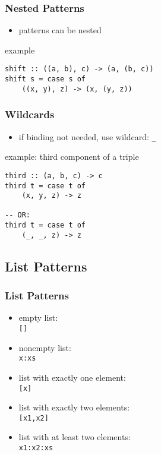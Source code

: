 \documentclass[dvipsnames]{beamer}
\theoremstyle{plain}
\begin{document}
\begin{frame}[fragile]
  \frametitle{Nested Patterns}

  \begin{itemize}
    \item patterns can be nested
  \end{itemize}

  \begin{exampleblock}{example}
    \begin{lstlisting}
shift :: ((a, b), c) -> (a, (b, c))
shift s = case s of
    ((x, y), z) -> (x, (y, z))
    \end{lstlisting}
  \end{exampleblock}
\end{frame}

\begin{frame}[fragile]
  \frametitle{Wildcards}

  \begin{itemize}
    \item if binding not needed, use wildcard: \lstinline|_|
  \end{itemize}

  \begin{exampleblock}{example: third component of a triple}
    \begin{lstlisting}
third :: (a, b, c) -> c
third t = case t of
    (x, y, z) -> z

-- OR:
third t = case t of
    (_, _, z) -> z
    \end{lstlisting}
  \end{exampleblock}
\end{frame}

\subsection{List Patterns}

\begin{frame}[fragile]
  \frametitle{List Patterns}

  \begin{itemize}
    \item empty list:\\
      \lstinline|[]|
    \item nonempty list:\\
      \lstinline|x:xs|
    \item list with exactly one element:\\
      \lstinline|[x]|
    \item list with exactly two elements:\\
      \lstinline|[x1,x2]|
    \item list with at least two elements:\\
      \lstinline|x1:x2:xs|
  \end{itemize}
\end{frame}
\end{document}
